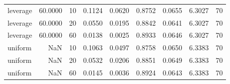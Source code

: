 \begin{table}
\begin{tabular}{lrrrrrrrr}
leverage & 60.0000 & 10 & 0.1124 & 0.0620 & 0.8752 & 0.0655 & 6.3027 & 70 \\
leverage & 60.0000 & 20 & 0.0550 & 0.0195 & 0.8842 & 0.0641 & 6.3027 & 70 \\
leverage & 60.0000 & 60 & 0.0138 & 0.0025 & 0.8933 & 0.0646 & 6.3027 & 70 \\
uniform & NaN & 10 & 0.1063 & 0.0497 & 0.8758 & 0.0650 & 6.3383 & 70 \\
uniform & NaN & 20 & 0.0532 & 0.0206 & 0.8851 & 0.0649 & 6.3383 & 70 \\
uniform & NaN & 60 & 0.0145 & 0.0036 & 0.8924 & 0.0643 & 6.3383 & 70 \\
\bottomrule
\end{tabular}
\end{table}
